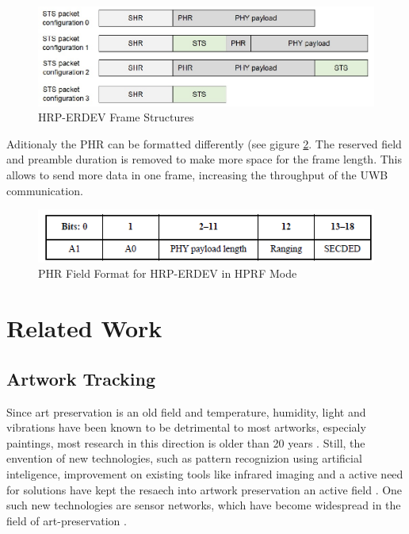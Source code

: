 \begin{figure}[ht!]
\centering
\includegraphics[width=\linewidth]{graphics/HRP_ERDEV_frame_structures.jpg}
\caption{HRP-ERDEV Frame Structures \cite{hsu_2021}}
\label{f:HRP-erdev frame}
\end{figure}

Aditionaly the PHR can be formatted differently (see gigure \ref{f:PHR 4z}. 
The reserved field and preamble duration is removed to make more space for the frame length. This allows to send more data in one frame, increasing the throughput of the UWB communication.

\begin{figure}[ht!]
\centering
\includegraphics[width=\linewidth]{graphics/HRP_ERDEV_HPRF_mode_PHR.png}
\caption{PHR Field Format for HRP-ERDEV in HPRF Mode \cite{IEEE4z}}
\label{f:PHR 4z}
\end{figure}


\section{Related Work} %


\subsection{Artwork Tracking}


Since art preservation is an old field and temperature, humidity, light and vibrations have been known to be detrimental to most artworks, especialy paintings, most research in this direction is older than 20 years \cite{mecklenburg1991mechanical, michalski1991paintings, saunders2004effect}.
Still, the envention of new technologies, such as pattern recognizion using artificial inteligence, improvement on existing tools like infrared imaging and a active need for solutions have kept the resaech into artwork preservation an active field \cite{borg2020application, schito2017integrated}.
One such new technologies are sensor networks, which have become widespread in the field of art-preservation \cite{shah2016customized}.


